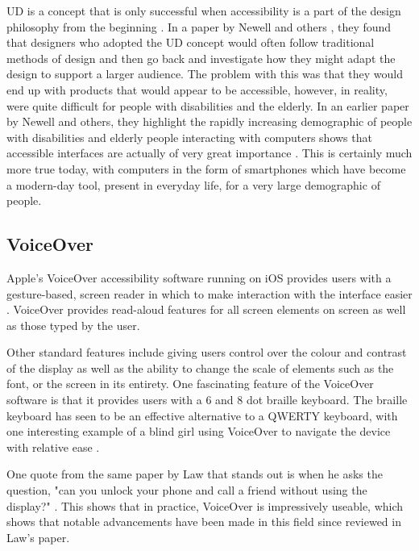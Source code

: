 UD is a concept that is only successful when accessibility is a part of the design philosophy from the beginning \cite{incldesign}.
In a paper by Newell and others \cite{incldesign}, they found that designers who adopted the UD concept would often follow traditional methods of design and then go back and investigate how they might adapt the design to support a larger audience.
The problem with this was that they would end up with products that would appear to be accessible, however, in reality, were quite difficult for people with disabilities and the elderly.
In an earlier paper by Newell and others, they highlight the rapidly increasing demographic of people with disabilities and elderly people interacting with computers shows that accessible interfaces are actually of very great importance \cite{computerinterface}.
This is certainly much more true today, with computers in the form of smartphones which have become a modern-day tool, present in everyday life, for a very large demographic of people.


\subsection{VoiceOver}
Apple's VoiceOver accessibility software running on iOS provides users with a gesture-based, screen reader in which to make interaction with the interface easier \cite{iphone}.
VoiceOver provides read-aloud features for all screen elements on screen as well as those typed by the user.

Other standard features include giving users control over the colour and contrast of the display as well as the ability to change the scale of elements such as the font, or the screen in its entirety.
One fascinating feature of the VoiceOver software is that it provides users with a 6 and 8 dot braille keyboard. 
The braille keyboard has seen to be an effective alternative to a QWERTY keyboard, with one interesting example of a blind girl using VoiceOver to navigate the device with relative ease \cite{blind}. %

One quote from the same paper by Law that stands out is when he asks the question, "can you unlock your phone and call a friend without using the display?" \cite{cellphone}.
This shows that in practice, VoiceOver is impressively useable, which shows that notable advancements have been made in this field since reviewed in Law's paper.

